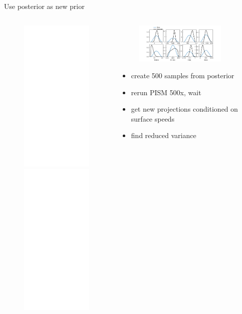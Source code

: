 \documentclass[hide notes,intlimits]{beamer}
\begin{document}
\begin{frame}{Use posterior as new prior}
\begin{columns}[c]
    \begin{column}{.5\textwidth}
      \begin{figure}
        \includegraphics<1>[height=7.5cm]{sle_pdf_w_obs_as19_2020.pdf}
        \includegraphics<2>[height=7.5cm]{sle_pdf_w_obs_as19flow_2020.pdf}
    \end{figure}
    \end{column}
    \begin{column}{.5\textwidth}
      \begin{figure}
    \includegraphics[width=0.85\textwidth]{prior_posterior}
  \end{figure}

  \begin{itemize}
  \item<1> create 500 samples from posterior
  \item<1> rerun PISM 500x, wait
  \item<2> get new projections conditioned on surface speeds
  \item<2> find reduced variance
  \end{itemize}
    \end{column}
  \end{columns}

\end{frame}
\end{document}
